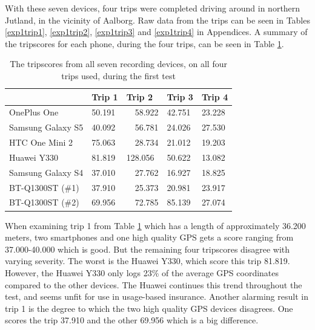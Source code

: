 With these seven devices, four trips were completed driving around in northern Jutland, in the vicinity of Aalborg. Raw data from the trips can be seen in Tables \ref{exp1trip1}, \ref{exp1trip2}, \ref{exp1trip3} and \ref{exp1trip4} in Appendices. A summary of the tripscores for each phone, during the four trips, can be seen in Table \ref{tab:smartphone_test_one}.

\begin{table}[tb]
\centering
\caption{The tripscores from all seven recording devices, on all four trips used, during the first test}
\label{tab:smartphone_test_one}
\begin{tabular}{|l|llll|}
\hline
\rowcolor{tablegreen}

                   & \textbf{Trip 1}    & \textbf{Trip 2}    & \textbf{Trip 3}    & \textbf{Trip 4}  \\\hline
OnePlus One        & 50.191   & \ \  58.922   & 42.751   & 23.228 \\
Samsung Galaxy S5  & 40.092   & \ \ 56.781   & 24.026   & 27.530 \\
HTC One Mini 2     & 75.063   & \ \ 28.734   & 21.012   & 19.203 \\
Huawei Y330        & 81.819   &  128.056   & 50.622   & 13.082 \\
Samsung Galaxy S4  & 37.010   & \ \ 27.762   & 16.927   & 18.825 \\
BT-Q1300ST (\#1)   & 37.910   & \ \ 25.373   & 20.981   & 23.917 \\
BT-Q1300ST (\#2)   & 69.956   & \ \ 72.785   & 85.139   & 27.074 \\\hline

\end{tabular}
\end{table}

When examining trip 1 from Table \ref{tab:smartphone_test_one} which has a length of approximately 36.200 meters, two smartphones and one high quality GPS gets a score ranging from 37.000-40.000 which is good. But the remaining four tripscores disagree with varying severity. The worst is the Huawei Y330, which score this trip 81.819. However, the Huawei Y330 only logs 23\% of the average GPS coordinates compared to the other devices. The Huawei continues this trend throughout the test, and seems unfit for use in usage-based insurance. Another alarming result in trip 1 is the degree to which the two high quality GPS devices disagrees. One scores the trip 37.910 and the other 69.956 which is a big difference.

